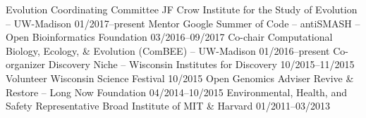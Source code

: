 

\begin{cvhonors}
  \cvhonor
    {Evolution Coordinating Committee} %
    {JF Crow Institute for the Study of Evolution -- UW-Madison} %
    {01/2017--present} %
  \cvhonor
    {Mentor} %
    {Google Summer of Code -- antiSMASH -- Open Bioinformatics Foundation} %
    {03/2016--09/2017} %
  \cvhonor
    {Co-chair} %
    {Computational Biology, Ecology, \& Evolution (ComBEE) -- UW-Madison} %
    {01/2016--present} %
  \cvhonor
    {Co-organizer} %
    {Discovery Niche -- Wisconsin Institutes for Discovery} %
    {10/2015--11/2015} %
  \cvhonor
    {Volunteer} %
    {Wisconsin Science Festival} %
    {10/2015} %
  \cvhonor
    {Open Genomics Adviser} %
    {Revive \& Restore -- Long Now Foundation} %
    {04/2014--10/2015} %
  \cvhonor
    {Environmental, Health, and Safety Representative} %
    {Broad Institute of MIT \& Harvard} %
    {01/2011--03/2013} %
\end{cvhonors}